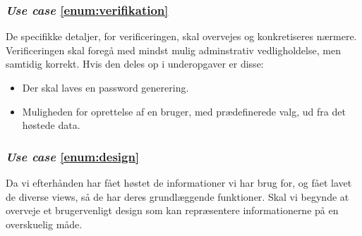 \documentclass[11pt]{article}
\begin{document}
\subsubsection*{\textit{Use case} \ref{enum:verifikation}}
De specifikke detaljer, for verificeringen, skal overvejes og konkretiseres nærmere. Verificeringen skal foregå med mindst mulig adminstrativ vedligholdelse, men samtidig korrekt. Hvis den deles op i underopgaver er disse:
\begin{itemize}
	\item Der skal laves en password generering.
	\item Muligheden for oprettelse af en bruger, med prædefinerede valg, ud fra det høstede data.
\end{itemize}

\subsubsection*{\textit{Use case} \ref{enum:design}}
Da vi efterhånden har fået høstet de informationer vi har brug for, og fået lavet de diverse views, så de har deres grundlæggende funktioner. Skal vi begynde at overveje et brugervenligt design som kan repræsentere informationerne på en overskuelig måde. 
\end{document}
